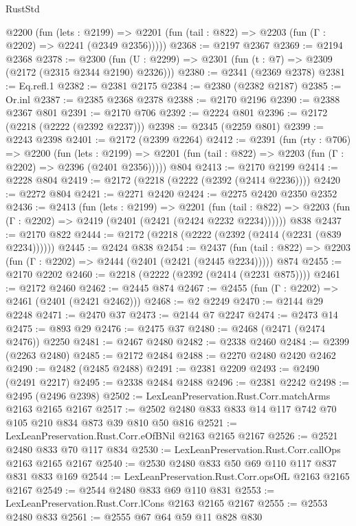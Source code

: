 \begin{lexlean}{RustStd}
\begin{coremodule}
    @2200
      (fun (lets : @2199) =>
      @2201 (fun (tail : @822) => @2203 (fun (Γ : @2202) => @2241 (@2349 @2356)))))
@2368 := @2197 @2367
@2369 := @2194 @2368
@2378 := @2300 (fun (U : @2299) => @2301 (fun (t : @7) => @2309 (@2172 (@2315 @2344 @2190) @2326)))
@2380 := @2341 (@2369 @2378)
@2381 := Eq.refl.{1}
@2382 := @2381 @2175
@2384 := @2380 (@2382 @2187)
@2385 := Or.inl
@2387 := @2385 @2368 @2378
@2388 := @2170 @2196
@2390 := @2388 @2367 @801
@2391 := @2170 @706
@2392 := @2224 @801
@2396 := @2172 (@2218 (@2222 (@2392 @2237)))
@2398 := @2345 (@2259 @801)
@2399 := @2243 @2398
@2401 := @2172 (@2399 @2264)
@2412 := @2391
    (fun (rty : @706) =>
    @2200
      (fun (lets : @2199) =>
      @2201 (fun (tail : @822) => @2203 (fun (Γ : @2202) => @2396 (@2401 @2356)))))
    @804
@2413 := @2170 @2199
@2414 := @2228 @804
@2419 := @2172 (@2218 (@2222 (@2392 (@2414 @2236))))
@2420 := @2272 @804
@2421 := @2271 @2420
@2424 := @2275 @2420 @2350 @2352
@2436 := @2413
    (fun (lets : @2199) =>
    @2201
      (fun (tail : @822) => @2203 (fun (Γ : @2202) => @2419 (@2401 (@2421 (@2424 @2232 @2234))))))
    @838
@2437 := @2170 @822
@2444 := @2172 (@2218 (@2222 (@2392 (@2414 (@2231 (@839 @2234))))))
@2445 := @2424 @838
@2454 := @2437
    (fun (tail : @822) => @2203 (fun (Γ : @2202) => @2444 (@2401 (@2421 (@2445 @2234)))))
    @874
@2455 := @2170 @2202
@2460 := @2218 (@2222 (@2392 (@2414 (@2231 @875))))
@2461 := @2172 @2460
@2462 := @2445 @874
@2467 := @2455 (fun (Γ : @2202) => @2461 (@2401 (@2421 @2462)))
@2468 := @2 @2249
@2470 := @2144 @29 @2248
@2471 := @2470 @37
@2473 := @2144 @7 @2247
@2474 := @2473 @14
@2475 := @893 @29
@2476 := @2475 @37
@2480 := @2468 (@2471 (@2474 @2476)) @2250
@2481 := @2467 @2480
@2482 := @2338 @2460
@2484 := @2399 (@2263 @2480)
@2485 := @2172 @2484
@2488 := @2270 @2480 @2420 @2462
@2490 := @2482 (@2485 @2488)
@2491 := @2381 @2209
@2493 := @2490 (@2491 @2217)
@2495 := @2338 @2484 @2488
@2496 := @2381 @2242
@2498 := @2495 (@2496 @2398)
@2502 := LexLeanPreservation.Rust.Corr.matchArms @2163 @2165 @2167
@2517 := @2502 @2480 @833 @833 @14 @117 @742 @70 @105 @210 @834 @873 @39 @810 @50 @816
@2521 := LexLeanPreservation.Rust.Corr.eOfBNil @2163 @2165 @2167
@2526 := @2521 @2480 @833 @70 @117 @834
@2530 := LexLeanPreservation.Rust.Corr.callOps @2163 @2165 @2167
@2540 := @2530 @2480 @833 @50 @69 @110 @117 @837 @831 @833 @169
@2544 := LexLeanPreservation.Rust.Corr.opsOfL @2163 @2165 @2167
@2549 := @2544 @2480 @833 @69 @110 @831
@2553 := LexLeanPreservation.Rust.Corr.lCons @2163 @2165 @2167
@2555 := @2553 @2480 @833
@2561 := @2555 @67 @64 @59 @11 @828 @830

\end{coremodule}
\end{lexlean}
